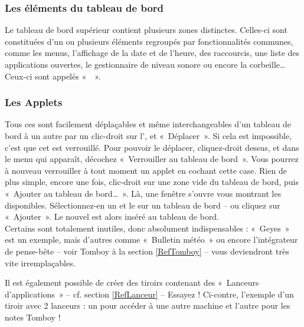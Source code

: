 \subsubsection{Les éléments du tableau de bord}
Le tableau de bord supérieur contient plusieurs zones distinctes. Celles-ci sont constituées d'un ou plusieurs éléments regroupés par fonctionnalités communes, comme les menus, l'affichage de la date et de l'heure, des raccourcis, une liste des applications ouvertes, le gestionnaire de niveau sonore ou encore la corbeille\ldots{} Ceux-ci sont appelés «~~».
\subsubsection{Les Applets}
\label{RefApplet}
Tous ces  sont facilement déplaçables et même interchangeables d'un tableau de bord à un autre par un clic-droit sur l', et «~Déplacer~». Si cela est impossible, c'est que cet  est verrouillé. Pour pouvoir le déplacer, cliquez-droit dessus, et dans le menu qui apparaît, décochez «~Verrouiller au tableau de bord~». Vous pourrez à nouveau verrouiller à tout moment un applet en cochant cette case.
Rien de plus simple, encore une fois, clic-droit sur une zone vide du tableau de bord, puis «~Ajouter au tableau de bord\ldots{}~». Là, une fenêtre s'ouvre vous montrant les  disponibles. Sélectionnez-en un et  le sur un tableau de bord -- ou cliquez sur «~Ajouter~». Le nouvel  est alors inséré au tableau de bord.\\
Certains sont totalement inutiles, donc absolument indispensables : «~Geyes~» est un exemple, mais d'autres comme «~Bulletin météo~» ou encore l'intégrateur de pense-bête -- voir Tomboy à la section \ref{RefTomboy} -- vous deviendront très vite irremplaçables.\par
{}
Il est également possible de créer des tiroirs contenant des «~Lanceurs d'applications~» -- cf. section \ref{RefLanceur} --  Essayez ! Ci-contre, l'exemple d'un tiroir avec 2 lanceurs : un pour accéder à une autre machine et l'autre pour les notes Tomboy !\\\\\\
